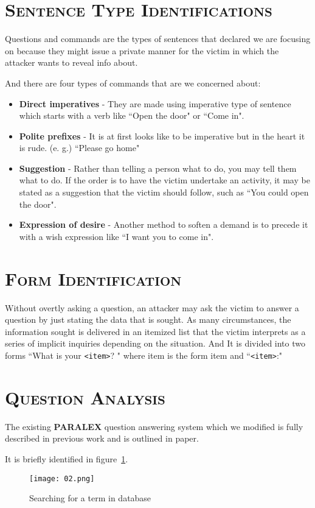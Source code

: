 \documentclass[margin=.4in]{paper}
\begin{document}
	\section{\textsc{Sentence Type Identifications}}
	
	Questions and commands are the types of sentences that declared we are focusing on because they might issue a private manner for the victim in which the attacker wants to reveal info about. 
	
	And there are four types of commands that are we concerned about:
	
	\begin{itemize}
		\item \textbf{Direct imperatives} - They are made using imperative type of sentence which starts with a verb like ``Open the door" or ``Come in".
		\item \textbf{Polite prefixes} - It is at first looks like to be imperative but in the heart it is rude. (e. g.) ``Please go home"
		\item \textbf{Suggestion} - Rather than telling a person what to do, you may tell them what to do.
		If the order is to have the victim undertake an activity, it may be stated as a suggestion that the victim should follow, such as ``You could open the door".
		\item \textbf{Expression of desire} - Another method to soften a demand is to precede it with a wish expression like ``I want you to come in".
	\end{itemize}
	
	\section{\textsc{Form Identification}}
	Without overtly asking a question, an attacker may ask the victim to answer a question by just stating the data that is sought. As many circumstances, the information sought is delivered in an itemized list that the victim interprets as a series of implicit inquiries depending on the situation.
	And It is divided into two forms ``What is your \texttt{<item>}? " where item is the form item and ``\texttt{<item>}:"
	
	\clearpage
	
	\section{\textsc{Question Analysis}}
	The existing \uppercase{\textbf{paralex}} question answering system which we modified is fully described in previous work and is outlined in paper.
	
	It is briefly identified in figure~\ref{fig:question_analysis}.
	
	\begin{figure}[htbp]
		\texttt{[image: 02.png]}
		\caption{Searching for a term in database}
		\label{fig:question_analysis}
	\end{figure}
\end{document}

